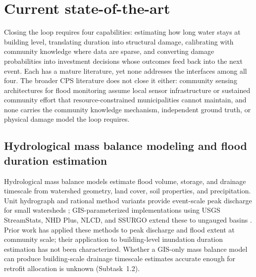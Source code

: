 \documentclass[11pt]{article}
\begin{document}

\vspace{-5pt}
\section{Current state-of-the-art}

Closing the loop requires four capabilities: estimating how long water stays at
building level, translating duration into structural damage, calibrating with
community knowledge where data are sparse, and converting damage probabilities
into investment decisions whose outcomes feed back into the next event.
Each has a mature literature, yet none addresses the interfaces among all four.
The broader CPS literature does not close it either: community sensing
architectures for flood monitoring assume local sensor infrastructure or
sustained community effort that resource-constrained municipalities cannot
maintain, and none carries the community knowledge mechanism, independent ground
truth, or physical damage model the loop requires.

\vspace{-0.3cm}
\subsection{Hydrological mass balance modeling and flood duration estimation}
Hydrological mass balance models estimate flood volume, storage, and drainage
timescale from watershed geometry, land cover, soil properties, and precipitation.
Unit hydrograph and rational method variants provide event-scale peak discharge for
small watersheds \cite{usdascs1986tr55}; GIS-parameterized implementations using
USGS StreamStats, NHD Plus, NLCD, and SSURGO extend these to ungauged basins
\cite{ries2017streamstats,moore2019nhdplus}.
Prior work has applied these methods to peak discharge and flood extent at community
scale; their application to building-level inundation duration estimation has not
been characterized. Whether a GIS-only mass balance model can produce building-scale
drainage timescale estimates accurate enough for retrofit allocation is unknown
(Subtask~1.2).

\vspace{-0.3cm}
\end{document}
